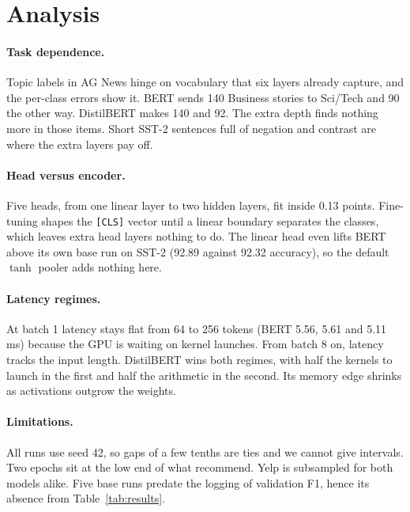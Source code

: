 \section{Analysis}
\label{sec:analysis}

\paragraph{Task dependence.} Topic labels in AG News hinge on
vocabulary that six layers already capture, and the per-class errors show it.
BERT sends 140 Business stories to Sci/Tech and 90 the other way. DistilBERT
makes 140 and 92. The extra depth finds nothing more in those items. Short SST-2
sentences full of negation and contrast are where the extra layers pay off.

\paragraph{Head versus encoder.} Five heads, from one linear layer
to two hidden layers, fit inside 0.13 points. Fine-tuning shapes the
\texttt{[CLS]} vector until a linear boundary separates the classes, which
leaves extra head layers nothing to do. The linear head
even lifts BERT above its own base run on SST-2 (92.89 against 92.32
accuracy), so the default $\tanh$ pooler adds nothing here.

\paragraph{Latency regimes.} At batch 1 latency stays flat from 64 to 256
tokens (BERT 5.56, 5.61 and 5.11\,ms) because the GPU is waiting on kernel
launches. From batch 8 on, latency tracks the input length. DistilBERT wins
both regimes, with half the kernels to launch in the first and half the
arithmetic in the second. Its memory edge shrinks as activations outgrow the
weights.

\paragraph{Limitations.} All runs use seed 42, so gaps of a few tenths are
ties and we cannot give intervals. Two epochs sit at the low end of what
\citet{devlin2019bert} recommend. Yelp is subsampled for both models alike. Five base runs predate the logging of
validation F1, hence its absence from Table~\ref{tab:results}.
